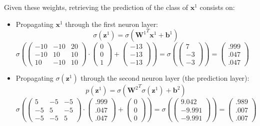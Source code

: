 		Given these weights, retrieving the prediction of the class of $\boldsymbol{x}^1$ consists on: 
		\begin{itemize}
			\item Propagating $\boldsymbol{x}^1$ through the first neuron layer:
			$$ \sigma(\boldsymbol{z}^1) = \sigma({\boldsymbol{W}^1}^T \boldsymbol{x}^1 + \boldsymbol{b}^1) $$
			$ \sigma \left(
			\left( \begin{matrix} -10 & -10 & 20 \\ -10 & 10 & 10 \\ 10 & -10 & 10 \end{matrix}\right) \cdot
			\left( \begin{matrix} 0  \\ 0  \\ 1  \end{matrix}\right) +
			\left( \begin{matrix} -13 \\ -13 \\ -13 \end{matrix}\right) \right) = 
			\sigma \left( 
			\left( \begin{matrix} 7 \\ -3 \\ -3 \end{matrix}\right) \right) = 
			\left( \begin{matrix} .999 \\ .047 \\ .047 \end{matrix}\right) $
			\item Propagating $\sigma(\boldsymbol{z}^1)$ through the second neuron layer (the prediction layer):
			$$ p(\boldsymbol{z}^1) = \sigma({\boldsymbol{W}^2}^T \sigma(\boldsymbol{z}^1) + \boldsymbol{b}^2) $$
			$ \sigma \left(
			\left( \begin{matrix} 5 & -5 & -5 \\ -5 & 5 & -5 \\ -5 & -5 & 5 \end{matrix}\right) \cdot
			\left( \begin{matrix} .999  \\ .047  \\ .047  \end{matrix}\right) +
			\left( \begin{matrix} 0 \\ 0 \\ 0 \end{matrix}\right) \right) = 
			\sigma \left( 
			\left( \begin{matrix} 9.042 \\ -9.991 \\ -9.991 \end{matrix}\right) \right) = 
			\left( \begin{matrix} .989 \\ .007 \\ .007 \end{matrix}\right) $
		\end{itemize}

